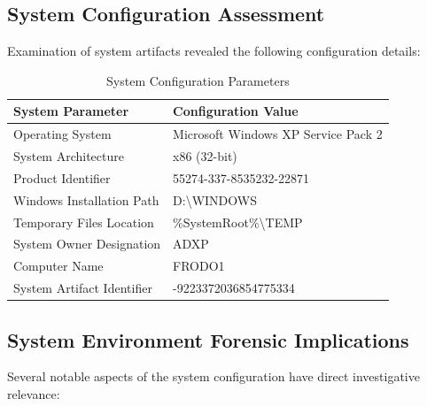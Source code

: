 \subsection{System Configuration Assessment}
Examination of system artifacts revealed the following configuration details:

\begin{table}[htbp]
\centering
\begin{tabular}{|p{5cm}|p{8.5cm}|}
\hline
\textbf{System Parameter} & \textbf{Configuration Value} \\
\hline
Operating System & Microsoft Windows XP Service Pack 2 \\
\hline
System Architecture & x86 (32-bit) \\
\hline
Product Identifier & 55274-337-8535232-22871 \\
\hline
Windows Installation Path & D:\textbackslash{}WINDOWS \\
\hline
Temporary Files Location & \%SystemRoot\%\textbackslash{}TEMP \\
\hline
System Owner Designation & ADXP \\
\hline
Computer Name & FRODO1 \\
\hline
System Artifact Identifier & -9223372036854775334 \\
\hline
\end{tabular}
\caption{System Configuration Parameters}
\label{table:system_config}
\end{table}

\subsection{System Environment Forensic Implications}
Several notable aspects of the system configuration have direct investigative relevance:

